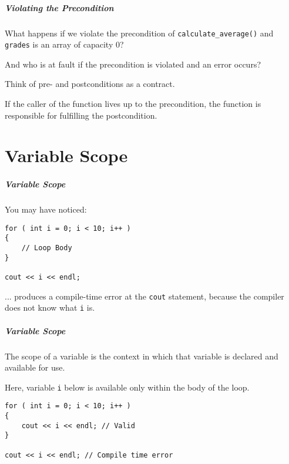 \begin{frame}
\frametitle{Violating the Precondition}
What happens if we violate the precondition of \texttt{calculate\_average()} and \texttt{grades} is an array of capacity 0?

And who is at fault if the precondition is violated and an error occurs?

Think of pre- and postconditions as a contract. 

If the caller of the function lives up to the precondition, the function is responsible for fulfilling the postcondition.

\end{frame}

\part{Variable Scope}
\begin{frame}\partpage\end{frame}


\begin{frame}[fragile]
\frametitle{Variable Scope}
You may have noticed:

\begin{verbatim}
for ( int i = 0; i < 10; i++ )
{
    // Loop Body
}

cout << i << endl;
\end{verbatim}

... produces a compile-time error at the \texttt{cout} statement, because the compiler does not know what \texttt{i} is.

\end{frame}

\begin{frame}[fragile]
\frametitle{Variable Scope}
The \alert{scope} of a variable is the context in which that variable is declared and available for use.

Here, variable \texttt{i} below is available only within the body of the loop.

\begin{verbatim}
for ( int i = 0; i < 10; i++ )
{
    cout << i << endl; // Valid
}

cout << i << endl; // Compile time error
\end{verbatim}

\end{frame}

